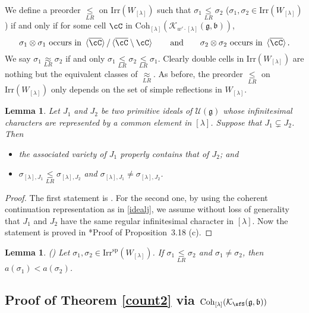 \documentclass[12pt,a4paper]{amsart}
\newcommand{\CK}{{\mathcal {K}}}
\newcommand{\CU}{{\mathcal {U}}}
\newcommand{\g}{\mathfrak g}
\renewcommand{\b}{\mathfrak b}
\numberwithin{equation}{section}
\newtheorem{lem}[thm]{Lemma}
\theoremstyle{remark}
\def\Irr{\mathrm{Irr}}
\def\Irrsp{\mathrm{Irr}^{\mathrm{sp}}}
\def\WLam{W_{\Lam}}
\def\Coh{\mathrm{Coh}}
\def\leqLR{\mathrel{\mathop{\leq}\limits_{\scriptscriptstyle LR}}}
\def\approxLR{\mathrel{\mathop{\approx}\limits_{\scriptscriptstyle LR}}}
\newcommand{\Lam}{{[\lambda]}}
\begin{document}
We define a preorder $\leqLR $ on $\Irr(\WLam)$ such that $\sigma_{1}\leqLR \sigma_{2}$ ($\sigma_1, \sigma_2\in \Irr(\WLam)$) if and only if for some  cell $\cC$ in $\Coh_\Lam(\CK_{w'\cdot \Lam}(\g,\b))$,
\[
\sigma_{1}\otimes \sigma_{1} \text{ occurs in }
\braket{\overline \cC}/ \braket{\overline \cC\setminus \cC}\qquad \textrm{and}\qquad \sigma_{2}\otimes \sigma_{2} \text{ occurs in } \braket{\overline \cC}.
 \]
 We say $\sigma_{1}\approxLR \sigma_{2}$ if and only
$\sigma_{1}\leqLR \sigma_{2}\leqLR\sigma_{1}$.
Clearly double cells in $\Irr(\WLam)$ are nothing but the equivalent classes of
$\approxLR$. As before, the  preorder $\leqLR $ on $\Irr(\WLam)$ only depends on the set of simple reflections in $\WLam$.
\begin{lem}\label{lem:ord}
 Let $J_1$ and $J_2$ be two primitive ideals of $\CU(\g)$ whose infinitesimal characters are represented by a common element in $\Lam$.
  Suppose that $J_1\subsetneq J_2$. Then
          \begin{itemize}%
            \item the associated variety of $J_{1}$ properly contains that of $J_{2}$;  and
            \item $\sigma_{\Lam, J_{1}}\leqLR \sigma_{\Lam, J_{2}}$ and $\sigma_{\Lam, J_{1}}\neq \sigma_{\Lam, J_{2}}$.
          \end{itemize}

 \end{lem}
\begin{proof}
    The first statement is \cite[Korollar 3.6]{BK}.
    For the second one, by using the coherent continuation representation as in \eqref{idealj},
    we assume without loss of generality that $J_{1}$ and $J_{2}$
    have the same regular infinitesimal character in $\Lam$.
    Now the statement is proved in \cite{BV2}*{Proof of Proposition~3.18 (c)}.
\end{proof}

\begin{lem}\label{lem:ord2}(\cite[Lemma 3.22]{BV2})
Let $\sigma_{1}, \sigma_{2}\in \Irrsp(\WLam)$. If
    $\sigma_{1}\leqLR\sigma_{2}$ and $\sigma_{1}\neq \sigma_{2}$, then
   $a(\sigma_{1})<a(\sigma_{2})$.
\end{lem}

\subsection{Proof of Theorem \ref{count2} via $\Coh_{\Lam}(\CK_\sfS(\g,\b))$}
\end{document}

